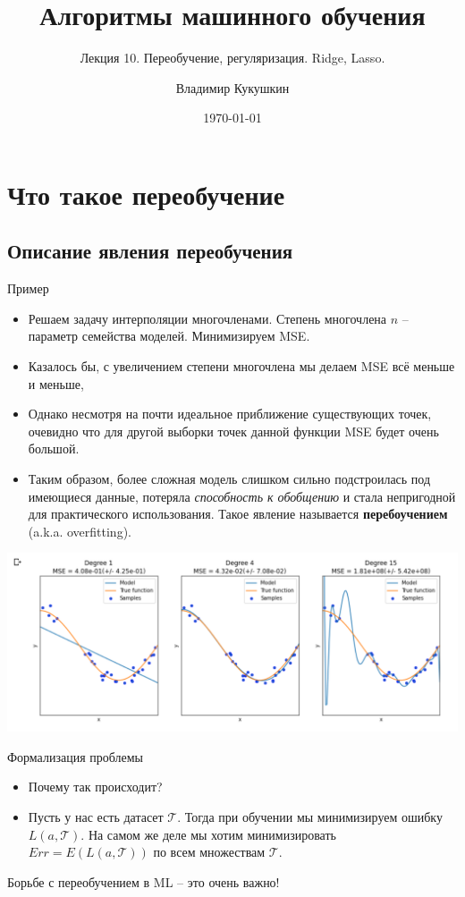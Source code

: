 \documentclass[9pt]{beamer}
\title{Алгоритмы машинного обучения}
\subtitle{Лекция 10. Переобучение, регуляризация. Ridge, Lasso.}
\author{Владимир Кукушкин}
\institute{СПбГЭУ - 2020}
\date{\today}
\begin{document}
\titlepage

\section{Что такое переобучение}
\subsection{Описание явления переобучения}

\begin{frame}{Пример}
\begin{itemize}
    \item Решаем задачу интерполяции многочленами. Степень многочлена $n$ -- параметр семейства моделей. Минимизируем MSE.
    \item Казалось бы, с увеличением степени многочлена мы делаем MSE всё меньше и меньше,
    \item Однако несмотря на почти идеальное приближение существующих точек, очевидно что для другой выборки точек данной функции MSE будет очень большой.
    \item Таким образом, более сложная модель слишком сильно подстроилась под имеющиеся данные, потеряла \textit{способность к обобщению} и стала непригодной для практического использования. Такое явление называется \textbf{перебоучением} (a.k.a. overfitting).
\end{itemize}
\begin{center}
    \includegraphics[height=0.35\textheight]{img/underfitting_overfitting.png}
\end{center}
\end{frame}

\begin{frame}{Формализация проблемы}
    \begin{itemize}
        \item Почему так происходит?
        \item Пусть у нас есть датасет $\mathcal{T}$. Тогда при обучении мы минимизируем ошибку $L(a, \mathcal{T})$. На самом же деле мы хотим минимизировать $Err = E(L(a, \mathcal{T}))$ по всем множествам $\mathcal{T}$.
    \end{itemize}
Борьбе с переобучением в ML -- это очень важно!
\end{frame}
\end{document}
